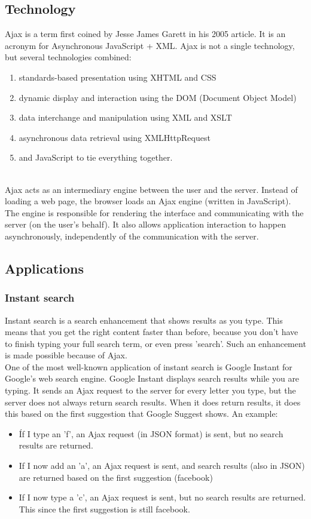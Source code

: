 \subsection{Technology}
Ajax is a term first coined by Jesse James Garett in his 2005 article. It is an acronym for Asynchronous JavaScript + XML. Ajax is not a single technology, but several technologies combined:
\begin{enumerate}
	\item standards-based presentation using XHTML and CSS
	\item dynamic display and interaction using the DOM (Document Object Model)
	\item data interchange and manipulation using XML and XSLT
	\item asynchronous data retrieval using XMLHttpRequest
	\item and JavaScript to tie everything together.
\end{enumerate} 
~\\
Ajax acts as an intermediary engine between the user and the server. Instead of loading a web page, the browser loads an Ajax engine (written in JavaScript). The engine is responsible for rendering the interface and communicating with the server (on the user's behalf). It also allows application interaction to happen asynchronously, independently of the communication with the server.
	
\subsection{Applications}
		
\subsubsection{Instant search}
Instant search is a search enhancement that shows results as you type. This means that you get the right content faster than before, because you don't have to finish typing your full search term, or even press 'search'. Such an enhancement is made possible because of Ajax.\\
	
One of the most well-known application of instant search is Google Instant for Google's web search engine. Google Instant displays search results while you are typing. It sends an Ajax request to the server for every letter you type, but the server does not always return search results. When it does return results, it does this based on the first suggestion that Google Suggest shows. An example:
\begin{itemize}
	\setlength\itemsep{0em}
	\item Íf I type an 'f', an Ajax request (in JSON format) is sent, but no search results are returned.
	\item If I now add an 'a', an Ajax request is sent, and search results (also in JSON) are returned based on the first suggestion (facebook)
	\item If I now type a 'c', an Ajax request is sent, but no search results are returned. This since the first suggestion is still facebook.
\end{itemize}
	
